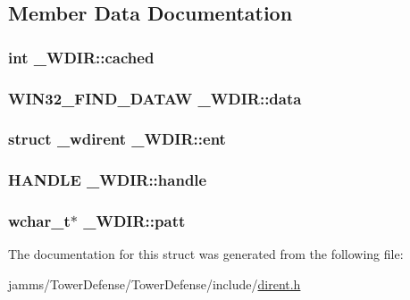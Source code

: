 \subsection{Member Data Documentation}
\hypertarget{struct___w_d_i_r_a9b7432df163d1e291ba5925347fd4af3}{
\subsubsection[{cached}]{\setlength{\rightskip}{0pt plus 5cm}int \+\_\+\+W\+D\+I\+R\+::cached}}\label{struct___w_d_i_r_a9b7432df163d1e291ba5925347fd4af3}
\hypertarget{struct___w_d_i_r_a065b17b666ee06c4e8068d8accb0eef9}{
\subsubsection[{data}]{\setlength{\rightskip}{0pt plus 5cm}W\+I\+N32\+\_\+\+F\+I\+N\+D\+\_\+\+D\+A\+T\+A\+W \+\_\+\+W\+D\+I\+R\+::data}}\label{struct___w_d_i_r_a065b17b666ee06c4e8068d8accb0eef9}
\hypertarget{struct___w_d_i_r_a84ae1457352005f813ed4b3dc1994b62}{
\subsubsection[{ent}]{\setlength{\rightskip}{0pt plus 5cm}struct {\bf \+\_\+wdirent} \+\_\+\+W\+D\+I\+R\+::ent}}\label{struct___w_d_i_r_a84ae1457352005f813ed4b3dc1994b62}
\hypertarget{struct___w_d_i_r_a694510e166fd3e797b3e15b9e4b3810a}{
\subsubsection[{handle}]{\setlength{\rightskip}{0pt plus 5cm}H\+A\+N\+D\+L\+E \+\_\+\+W\+D\+I\+R\+::handle}}\label{struct___w_d_i_r_a694510e166fd3e797b3e15b9e4b3810a}
\hypertarget{struct___w_d_i_r_a700ff3a1096fb36452c571b0f55b4e60}{
\subsubsection[{patt}]{\setlength{\rightskip}{0pt plus 5cm}wchar\+\_\+t$\ast$ \+\_\+\+W\+D\+I\+R\+::patt}}\label{struct___w_d_i_r_a700ff3a1096fb36452c571b0f55b4e60}


The documentation for this struct was generated from the following file\+:\begin{DoxyCompactItemize}
\item 
jamms/\+Tower\+Defense/\+Tower\+Defense/include/\hyperlink{dirent_8h}{dirent.\+h}\end{DoxyCompactItemize}
